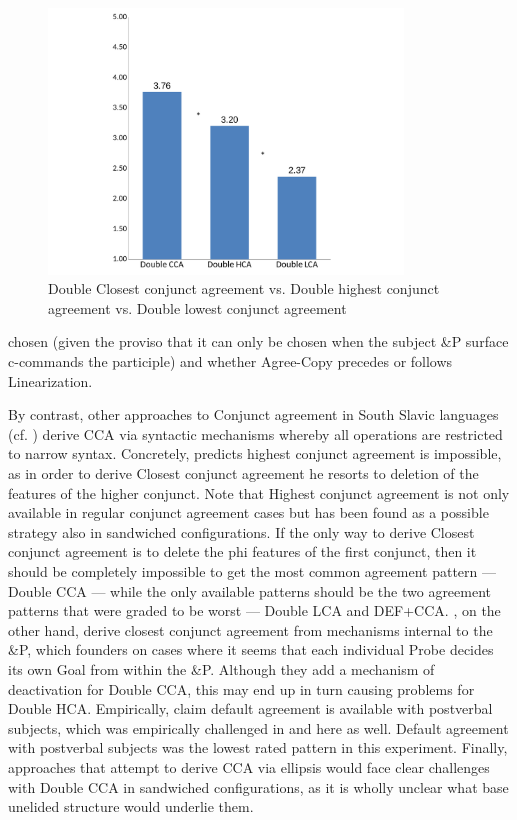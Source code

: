 \documentclass[output=paper
,modfonts
,nonflat]{langsci/langscibook}
\begin{document}
\begin{figure}[h]
	\begin{center}
		\includegraphics[height=200pt]{figures/cca_hca_lca_nl.pdf}
	\end{center}
	\caption{Double Closest conjunct agreement vs. Double highest conjunct agreement vs. Double lowest conjunct agreement}
	\label{fig:figure_cca_hca_lca}
\end{figure}
\noindent chosen (given the proviso that it can only be chosen when the subject \&P surface c-commands the participle) and whether Agree-Copy precedes or follows Linearization.

By contrast, other approaches to Conjunct agreement in South Slavic languages (cf. \citealt{boskovic:09,puskarmurphy:17}) derive CCA via syntactic mechanisms whereby all operations are restricted to narrow syntax. Concretely, \cite{boskovic:09} predicts highest conjunct agreement is impossible, as in order to derive Closest conjunct agreement he resorts to deletion of the features of the higher conjunct. Note that Highest conjunct agreement is not only available in regular conjunct agreement cases but has been found as a possible strategy also in sandwiched configurations. If the only way to derive Closest conjunct agreement is to delete the phi features of the first conjunct, then it should be completely impossible to get the most common agreement pattern --- Double CCA --- while the only available patterns should be the two agreement patterns that were graded to be worst --- Double LCA and DEF+CCA. \cite{puskarmurphy:17}, on the other hand, derive closest conjunct agreement from mechanisms internal to the \&P, which founders on cases where it seems that each individual Probe decides its own Goal from within the \&P. Although they add a mechanism of deactivation for Double CCA, this may end up in turn causing problems for Double HCA. Empirically, \cite{puskarmurphy:17} claim default agreement is available with postverbal subjects, which was empirically challenged in \cite{willergold:16} and here as well. Default agreement with postverbal subjects was the lowest rated pattern in this experiment. Finally, approaches that attempt to derive CCA via ellipsis would face clear challenges with Double CCA in sandwiched configurations, as it is wholly unclear what base unelided structure would underlie them.
\end{document}
